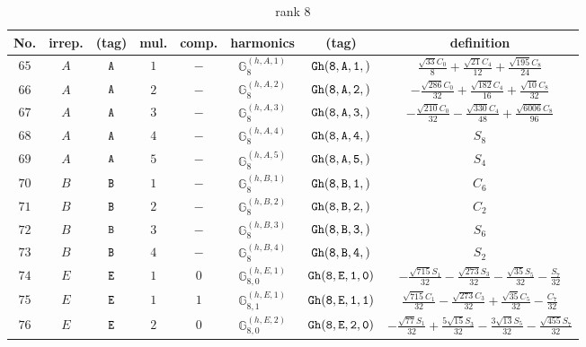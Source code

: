 \documentclass[fleqn,8pt]{jsarticle}
\begin{document}
\begin{table}[ht!]
\begin{center}
\caption{rank 8}
\renewcommand{\arraystretch}{1.3}
\begin{tabular}{cccccccc} \hline \hline
No. & irrep. & (tag) & mul. & comp. & harmonics & (tag) & definition \\ \hline
$ 65 $ & $ A $ & $ {\tt A} $ & $ 1 $ & $ - $ & $ \mathbb{G}_{8}^{(h,A,1)} $ & $ {\tt Gh(8,A,1,)} $ & $ \frac{\sqrt{33} C_{0}}{8} + \frac{\sqrt{21} C_{4}}{12} + \frac{\sqrt{195} C_{8}}{24} $ \\
$ 66 $ & $ A $ & $ {\tt A} $ & $ 2 $ & $ - $ & $ \mathbb{G}_{8}^{(h,A,2)} $ & $ {\tt Gh(8,A,2,)} $ & $ - \frac{\sqrt{286} C_{0}}{32} + \frac{\sqrt{182} C_{4}}{16} + \frac{\sqrt{10} C_{8}}{32} $ \\
$ 67 $ & $ A $ & $ {\tt A} $ & $ 3 $ & $ - $ & $ \mathbb{G}_{8}^{(h,A,3)} $ & $ {\tt Gh(8,A,3,)} $ & $ - \frac{\sqrt{210} C_{0}}{32} - \frac{\sqrt{330} C_{4}}{48} + \frac{\sqrt{6006} C_{8}}{96} $ \\
$ 68 $ & $ A $ & $ {\tt A} $ & $ 4 $ & $ - $ & $ \mathbb{G}_{8}^{(h,A,4)} $ & $ {\tt Gh(8,A,4,)} $ & $ S_{8} $ \\
$ 69 $ & $ A $ & $ {\tt A} $ & $ 5 $ & $ - $ & $ \mathbb{G}_{8}^{(h,A,5)} $ & $ {\tt Gh(8,A,5,)} $ & $ S_{4} $ \\
$ 70 $ & $ B $ & $ {\tt B} $ & $ 1 $ & $ - $ & $ \mathbb{G}_{8}^{(h,B,1)} $ & $ {\tt Gh(8,B,1,)} $ & $ C_{6} $ \\
$ 71 $ & $ B $ & $ {\tt B} $ & $ 2 $ & $ - $ & $ \mathbb{G}_{8}^{(h,B,2)} $ & $ {\tt Gh(8,B,2,)} $ & $ C_{2} $ \\
$ 72 $ & $ B $ & $ {\tt B} $ & $ 3 $ & $ - $ & $ \mathbb{G}_{8}^{(h,B,3)} $ & $ {\tt Gh(8,B,3,)} $ & $ S_{6} $ \\
$ 73 $ & $ B $ & $ {\tt B} $ & $ 4 $ & $ - $ & $ \mathbb{G}_{8}^{(h,B,4)} $ & $ {\tt Gh(8,B,4,)} $ & $ S_{2} $ \\
$ 74 $ & $ E $ & $ {\tt E} $ & $ 1 $ & $ 0 $ & $ \mathbb{G}_{8,0}^{(h,E,1)} $ & $ {\tt Gh(8,E,1,0)} $ & $ - \frac{\sqrt{715} S_{1}}{32} - \frac{\sqrt{273} S_{3}}{32} - \frac{\sqrt{35} S_{5}}{32} - \frac{S_{7}}{32} $ \\
$ 75 $ & $ E $ & $ {\tt E} $ & $ 1 $ & $ 1 $ & $ \mathbb{G}_{8,1}^{(h,E,1)} $ & $ {\tt Gh(8,E,1,1)} $ & $ \frac{\sqrt{715} C_{1}}{32} - \frac{\sqrt{273} C_{3}}{32} + \frac{\sqrt{35} C_{5}}{32} - \frac{C_{7}}{32} $ \\
$ 76 $ & $ E $ & $ {\tt E} $ & $ 2 $ & $ 0 $ & $ \mathbb{G}_{8,0}^{(h,E,2)} $ & $ {\tt Gh(8,E,2,0)} $ & $ - \frac{\sqrt{77} S_{1}}{32} + \frac{5 \sqrt{15} S_{3}}{32} - \frac{3 \sqrt{13} S_{5}}{32} - \frac{\sqrt{455} S_{7}}{32} $ \\

\end{tabular}
\end{center}
\end{table}
\end{document}
